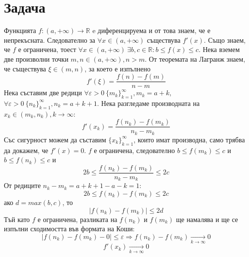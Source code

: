 \documentclass{article}
\newcommand*{\bR}{\mathbb{R}}
\begin{document}
\section[3]{Задача}
Функцията $f: (a, +\infty) \rightarrow \bR$ e диференцируема и от това знаем, че е непрекъсната.
Следователно за $\forall x \in (a, +\infty)$ съществува $f'(x)$. Също знаем, че $f$ е ограничена, тоест $\forall x \in (a, +\infty) \ \exists b, c \in \bR: b \leq f(x) \leq c$.
Нека вземем две произволни точки $m,n \in (a, +\infty), n>m$. От теоремата на Лагранж знаем, че съществува $\xi \in (m,n)$, за което е изпълнено
\[
    f'(\xi)=\frac{f(n)-f(m)}{n-m}
\]
Нека съставим две редици $\forall \varepsilon >0 \ \{m_k\}^\infty_{k=1}, m_k=a+k$, $\forall \varepsilon >0 \ \{n_k\}^\infty_{k=1}, n_k=a+k+1$.
Нека разгледаме производната на $x_k \in (m_k, n_k), k \rightarrow \infty$:
\[
    f'(x_k)=\frac{f(n_k)-f(m_k)}{n_k-m_k}
\]
Със сигурност можем да съставим $\{x_k\}^\infty_{k=1}$, които имат производна, само трябва да докажем, че $f'(x)=0$.
$f$ е ограничена, следователно $b\leq f(m_k)\leq c$ и $b\leq f(n_k)\leq c$ и
\[
    2b\leq \frac{f(n_k)-f(m_k)}{n_k-m_k} \leq 2c
\]
От редиците $n_k-m_k=a+k+1-a-k=1$:
\[
    2b\leq f(n_k)-f(m_k) \leq 2c
\]
ако $d=max(b,c)$, то
\[
    |f(n_k)-f(m_k)| \leq 2d
\]
Тъй като $f$ е ограничена, разликата на $f(n_k)$ и $f(m_k)$ ще намалява и ще се изпълни сходимостта във формата на Коши:
\[
    |f(n_k)-f(m_k) - 0| \leq \varepsilon \Rightarrow f(n_k)-f(m_k) \xrightarrow[k \rightarrow \infty]{} 0
\]
\[
    f'(x_k)\xrightarrow[k \rightarrow \infty]{} 0
\]
\end{document}
